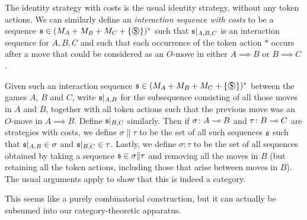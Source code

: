 The identity strategy with costs is the usual identity strategy, without any token actions.  
We can similarly define an \emph{interaction sequence with costs} to be a sequence $\s\in(M_A+M_B+M_C+\{\slot\})^*$ such that $\mathfrak s\vert_{A,B,C}$ is an interaction sequence for $A,B,C$ and such that each occurrence of the token action $*$ occurs after a move that could be considered as an $O$-move in either $A\implies B$ or $B\implies C$.

Given such an interaction sequence $\s\in(M_A+M_B+M_C+\{\slot\})^*$ between the games $A$, $B$ and $C$, write $\mathfrak s\vert_{A,B}$ for the subsequence consisting of all those moves in $A$ and $B$, together with all token actions such that the previous move was an $O$-move in $A\implies B$.  
Define $\mathfrak s\vert_{B,C}$ similarly.  
Then if $\sigma\colon A \multimap B$ and $\tau\colon B \multimap C$ are strategies with costs, we define $\sigma\|\tau$ to be the set of all such sequences $\mathfrak s$ such that $\mathfrak s\vert_{A,B}\in\sigma$ and $\mathfrak s\vert_{B,C}\in\tau$.  
Lastly, we define $\sigma;\tau$ to be the set of all sequences obtained by taking a sequence $\mathfrak s\in\sigma\|\tau$ and removing all the moves in $B$ (but retaining all the token actions, including those that arise between moves in $B$).  
The usual arguments apply to show that this is indeed a category.

This seems like a purely combinatorial construction, but it can actually be subsumed into our category-theoretic apparatus.

